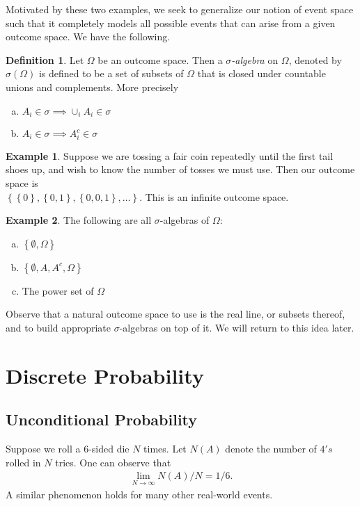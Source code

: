 \documentclass[12pt]{article}
\theoremstyle{plain}
\theoremstyle{definition}
\newtheorem*{definition}{Definition}
\newtheorem*{example}{Example}
\theoremstyle{remark}
\numberwithin{equation}{section}  %
\begin{document}
Motivated by these two examples, we seek to generalize our notion of
event space such that it completely models all possible events
that can arise from a given outcome space. We have the following.
\begin{definition}
Let $\Omega$ be an outcome space. Then a \emph{$\sigma$-algebra}
on $\Omega$, denoted by $\sigma(\Omega)$ is defined to be a
set of subsets of $\Omega$ that is closed under countable
unions and complements.
More precisely
\begin{enumerate}[a)]
\item $ A_i \in  \sigma \implies \cup_i A_i \in \sigma$
\item $A_i \in \sigma \implies A_i^c \in \sigma$
\end{enumerate}
\end{definition}
\begin{example}
Suppose we are tossing a fair coin repeatedly until the first tail shoes up,
and wish to know the number of tosses we must use. Then our outcome space
is \\ $ \left\{ \left\{ 0 \right\} , \left\{ 0,1 \right\} , \left\{ 0,0,1
\right\},\ldots \right\}$. This is an infinite outcome space.
\end{example}
\begin{example} The following are all $\sigma$-algebras of $\Omega$:
\begin{enumerate}[a)]
\item $\left\{ \emptyset, \Omega \right\}$
\item $\left\{ \emptyset, A, A^c, \Omega \right\}$
\item The power set of $\Omega$
\end{enumerate}
\end{example}
Observe that a natural outcome space to use is the real line, or subsets
thereof, and to build appropriate $\sigma$-algebras on top of it. We will return
to this idea later.

\section{Discrete Probability}
\subsection{Unconditional Probability}
Suppose we roll a $6$-sided die $N$ times. Let $N(A)$ denote the number of $4's$
rolled in $N$ tries. One can observe that
\begin{align*}
\lim_{N \to \infty} N(A)/N = 1/6.
\end{align*}
A similar phenomenon holds for many other real-world events.
\end{document}
